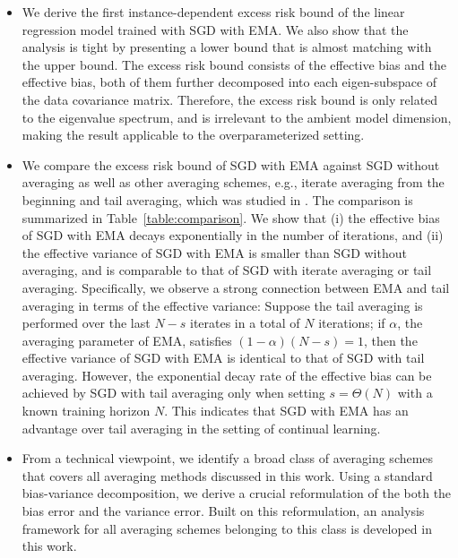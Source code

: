 \documentclass[11pt]{article}
\begin{document}
\begin{itemize}[leftmargin=*]
\item We derive the first instance-dependent excess risk bound of the linear regression model trained with SGD with EMA. We also show that the analysis is tight by presenting a lower bound that is almost matching with the upper bound. The excess risk bound consists of the effective bias and the effective bias, both of them further decomposed into each eigen-subspace of the data covariance matrix. Therefore, the excess risk bound is only related to the eigenvalue spectrum, and is irrelevant to the ambient model dimension, making the result applicable to the overparameterized setting.
\item We compare the excess risk bound of SGD with EMA against SGD without averaging as well as other averaging schemes, e.g., iterate averaging from the beginning and tail averaging, which was studied in \citet{zou2021benign}. The comparison is summarized in Table~\ref{table:comparison}. We show that (i) the effective bias of SGD with EMA decays exponentially in the number of iterations, and (ii) the effective variance of SGD with EMA is smaller than SGD without averaging, and is comparable to that of SGD with iterate averaging or tail averaging. Specifically, we observe a strong connection between EMA and tail averaging in terms of the effective variance: Suppose the tail averaging is performed over the last $N-s$ iterates in a total of $N$ iterations; if $\alpha$, the averaging parameter of EMA, satisfies $(1-\alpha)(N-s)=1$, then the effective variance of SGD with EMA is identical to that of SGD with tail averaging. However, the exponential decay rate of the effective bias can be achieved by SGD with tail averaging only when setting $s=\Theta(N)$ with a known training horizon $N$. This indicates that SGD with EMA has an advantage over tail averaging in the setting of continual learning.
\item From a technical viewpoint, we identify a broad class of averaging schemes that covers all averaging methods discussed in this work. Using a standard bias-variance decomposition, we derive a crucial reformulation of the both the bias error and the variance error. Built on this reformulation, an analysis framework for all averaging schemes belonging to this class is developed in this work.
\end{itemize}
\end{document}
